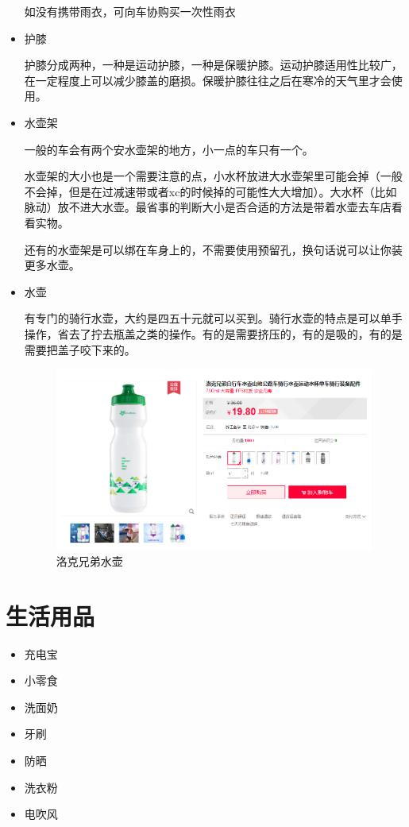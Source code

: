 \documentclass{ctexbook}
\begin{document}
\begin{itemize}
        如没有携带雨衣，可向车协购买一次性雨衣
        \item 护膝
        
        护膝分成两种，一种是运动护膝，一种是保暖护膝。运动护膝适用性比较广，在一定程度上可以减少膝盖的磨损。保暖护膝往往之后在寒冷的天气里才会使用。

        \item 水壶架
        
        一般的车会有两个安水壶架的地方，小一点的车只有一个。

        水壶架的大小也是一个需要注意的点，小水杯放进大水壶架里可能会掉（一般不会掉，但是在过减速带或者xc的时候掉的可能性大大增加）。大水杯（比如脉动）放不进大水壶。最省事的判断大小是否合适的方法是带着水壶去车店看看实物。


        
        还有的水壶架是可以绑在车身上的，不需要使用预留孔，换句话说可以让你装更多水壶。

        

        \item 水壶
        
        有专门的骑行水壶，大约是四五十元就可以买到。骑行水壶的特点是可以单手操作，省去了拧去瓶盖之类的操作。有的是需要挤压的，有的是吸的，有的是需要把盖子咬下来的。

      \begin{figure}[htp]
           \centering
           \label{fig:99}
           \includegraphics[width=0.7\linewidth]{fig/洛克兄弟-水壶}
           \caption{洛克兄弟水壶}
       \end{figure}
       
    \end{itemize}
\section{生活用品} 
    \begin{itemize}
        \item 充电宝
        \item 小零食
        \item 洗面奶
        \item 牙刷
        \item 防晒
        \item 洗衣粉
        \item 电吹风
    \end{itemize}
\end{document}
